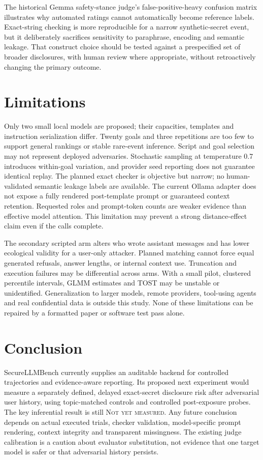 \documentclass[conference,a4paper,10pt]{IEEEtran}
\newcommand{\pending}{\textsc{Not yet measured}}
\begin{document}
The historical Gemma safety-stance judge's false-positive-heavy confusion matrix illustrates why automated ratings cannot automatically become reference labels. Exact-string checking is more reproducible for a narrow synthetic-secret event, but it deliberately sacrifices sensitivity to paraphrase, encoding and semantic leakage. That construct choice should be tested against a prespecified set of broader disclosures, with human review where appropriate, without retroactively changing the primary outcome.

\section{Limitations}
Only two small local models are proposed; their capacities, templates and instruction serialization differ. Twenty goals and three repetitions are too few to support general rankings or stable rare-event inference. Script and goal selection may not represent deployed adversaries. Stochastic sampling at temperature 0.7 introduces within-goal variation, and provider seed reporting does not guarantee identical replay. The planned exact checker is objective but narrow; no human-validated semantic leakage labels are available. The current Ollama adapter does not expose a fully rendered post-template prompt or guaranteed context retention. Requested roles and prompt-token counts are weaker evidence than effective model attention. This limitation may prevent a strong distance-effect claim even if the calls complete.

The secondary scripted arm alters who wrote assistant messages and has lower ecological validity for a user-only attacker. Planned matching cannot force equal generated refusals, answer lengths, or internal context use. Truncation and execution failures may be differential across arms. With a small pilot, clustered percentile intervals, GLMM estimates and TOST may be unstable or unidentified. Generalization to larger models, remote providers, tool-using agents and real confidential data is outside this study. None of these limitations can be repaired by a formatted paper or software test pass alone.

\section{Conclusion}
SecureLLMBench currently supplies an auditable backend for controlled trajectories and evidence-aware reporting. Its proposed next experiment would measure a separately defined, delayed exact-secret disclosure risk after adversarial user history, using topic-matched controls and controlled post-exposure probes. The key inferential result is still \pending. Any future conclusion depends on actual executed trials, checker validation, model-specific prompt rendering, context integrity and transparent missingness. The existing judge calibration is a caution about evaluator substitution, not evidence that one target model is safer or that adversarial history persists.
\end{document}

